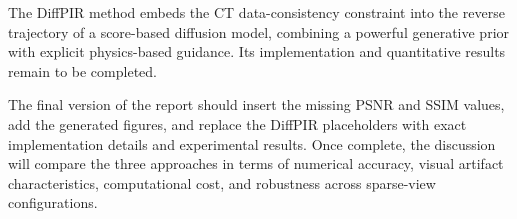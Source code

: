 \documentclass[11pt,a4paper]{article}
\begin{document}
The DiffPIR method embeds the CT data-consistency constraint into the reverse
trajectory of a score-based diffusion model, combining a powerful generative
prior with explicit physics-based guidance. Its implementation and quantitative
results remain to be completed.

The final version of the report should insert the missing PSNR and SSIM values,
add the generated figures, and replace the DiffPIR placeholders with exact
implementation details and experimental results. Once complete, the discussion
will compare the three approaches in terms of numerical accuracy, visual
artifact characteristics, computational cost, and robustness across sparse-view
configurations.



\end{document}
